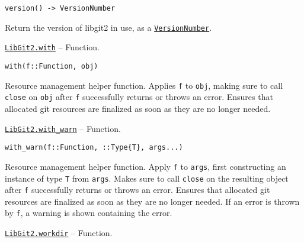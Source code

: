 \begin{adjustwidth}{2em}{0pt}


\begin{verbatim}
version() -> VersionNumber
\end{verbatim}

Return the version of libgit2 in use, as a \hyperlink{12935585355849408291}{\texttt{VersionNumber}}.



\end{adjustwidth}
\hypertarget{11949205828120857817}{} 
\hyperlink{11949205828120857817}{\texttt{LibGit2.with}}  -- {Function.}

\begin{adjustwidth}{2em}{0pt}


\begin{verbatim}
with(f::Function, obj)
\end{verbatim}

Resource management helper function. Applies \texttt{f} to \texttt{obj}, making sure to call \texttt{close} on \texttt{obj} after \texttt{f} successfully returns or throws an error. Ensures that allocated git resources are finalized as soon as they are no longer needed.



\end{adjustwidth}
\hypertarget{17446520273049220374}{} 
\hyperlink{17446520273049220374}{\texttt{LibGit2.with\_warn}}  -- {Function.}

\begin{adjustwidth}{2em}{0pt}


\begin{verbatim}
with_warn(f::Function, ::Type{T}, args...)
\end{verbatim}

Resource management helper function. Apply \texttt{f} to \texttt{args}, first constructing an instance of type \texttt{T} from \texttt{args}. Makes sure to call \texttt{close} on the resulting object after \texttt{f} successfully returns or throws an error. Ensures that allocated git resources are finalized as soon as they are no longer needed. If an error is thrown by \texttt{f}, a warning is shown containing the error.



\end{adjustwidth}
\hypertarget{6689577338311178757}{} 
\hyperlink{6689577338311178757}{\texttt{LibGit2.workdir}}  -- {Function.}

